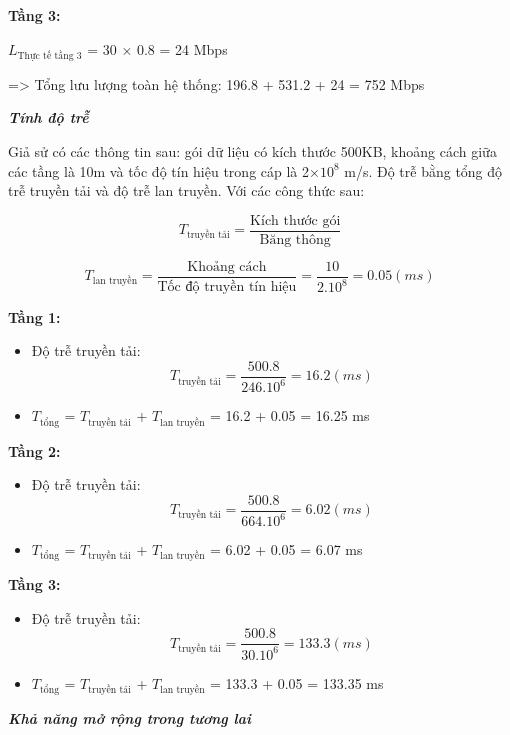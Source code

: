 \textbf{Tầng 3:}
\begin{center}
    $L_{\text{Thực tế tầng 3}}$ = 30 × 0.8 = 24 Mbps
\end{center}

=> Tổng lưu lượng toàn hệ thống: 196.8 + 531.2 + 24 = 752 Mbps

\textit{\textbf{Tính độ trễ}}

Giả sử có các thông tin sau: gói dữ liệu có kích thước 500KB, khoảng cách giữa các tầng là 10m và tốc độ tín hiệu trong cáp là 2×$10^8$ m/s. Độ trễ bằng tổng độ trễ truyền tải và độ trễ lan truyền. Với các công thức sau:

\begin{equation}
    T_{\text{truyền tải}} = \frac{\text{Kích thước gói}}{\text{Băng thông}}
\end{equation}

\begin{equation}
    T_{\text{lan truyền}} = \frac{\text{Khoảng cách}}{\text{Tốc độ truyền tín hiệu}} = \frac{10}{2 . 10^8} = 0.05 (ms)
\end{equation}

\textbf{Tầng 1:}
\begin{itemize}[left=2cm]
    \item Độ trễ truyền tải:
    \begin{equation}
    T_{\text{truyền tải}} = \frac{500 . 8}{246 . 10^6} = 16.2 (ms)
    \end{equation}
    \item $T_{\text{tổng}}$ = $T_{\text{truyền tải}}$ + $T_{\text{lan truyền}}$ = 16.2 + 0.05 = 16.25 ms
\end{itemize}

\textbf{Tầng 2:}
\begin{itemize}[left=2cm]
    \item Độ trễ truyền tải:
    \begin{equation}
    T_{\text{truyền tải}} = \frac{500 . 8}{664 . 10^6} = 6.02 (ms)
    \end{equation}
    \item $T_{\text{tổng}}$ = $T_{\text{truyền tải}}$ + $T_{\text{lan truyền}}$ = 6.02 + 0.05 = 6.07 ms
\end{itemize}

\textbf{Tầng 3:}
\begin{itemize}[left=2cm]
    \item Độ trễ truyền tải:
    \begin{equation}
    T_{\text{truyền tải}} = \frac{500 . 8}{30 . 10^6} = 133.3 (ms)
    \end{equation}
    \item $T_{\text{tổng}}$ = $T_{\text{truyền tải}}$ + $T_{\text{lan truyền}}$ = 133.3 + 0.05 = 133.35 ms
\end{itemize}
\newpage
\textit{\textbf{Khả năng mở rộng trong tương lai}}

